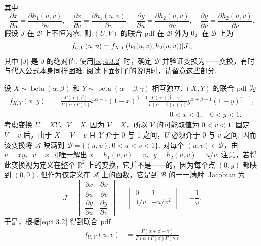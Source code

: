 其中
$$
\frac{\partial x}{\partial u}=\frac{\partial h_1(u,v)}{\partial u},\quad
\frac{\partial x}{\partial v}=\frac{\partial h_1(u,v)}{\partial v},\quad
\frac{\partial y}{\partial u}=\frac{\partial h_2(u,v)}{\partial u},\quad
\frac{\partial y}{\partial v}=\frac{\partial h_2(u,v)}{\partial v}.
$$
假设 $J$ 在 $\mathscr B$ 上不恒为零. 则 $(U,V)$ 的联合 pdf 在 $\mathscr B$ 外为 0，在 $\mathscr B$ 上为
\begin{equation}\label{eq:4.3.2}\index{SI0829@二元变换}
f_{U,V}(u,v)=f_{X,Y}(h_1(u,v),h_2(u,v))|J|,
\end{equation}
其中 $|J|$ 是 $J$ 的绝对值. 使用\eqref{eq:4.3.2} 时，确定 $\mathscr B$ 并验证变换为一一变换，有时与代入公式本身同样困难. 阅读下面例子的说明时，请留意这些部分.
\begin{example}\label{ex:4.3.3}
设 $X\sim\operatorname{beta}(\alpha,\beta)$ 和 $Y\sim\operatorname{beta}(\alpha+\beta,\gamma)$ 相互独立. $(X,Y)$ 的联合 pdf 为
$$
\begin{aligned}
f_{X,Y}(x,y)&=\frac{\Gamma(\alpha+\beta)}{\Gamma(\alpha)\Gamma(\beta)}x^{\alpha-1}(1-x)^{\beta-1}
\frac{\Gamma(\alpha+\beta+\gamma)}{\Gamma(\alpha+\beta)\Gamma(\gamma)}y^{\alpha+\beta-1}(1-y)^{\gamma-1},\\
&\hspace{7cm}0<x<1,\quad0<y<1.
\end{aligned}
$$
考虑变换 $U=XY$、$V=X$. 因为 $V=X$，所以 $V$ 的可能取值为 $0<v<1$. 固定 $V=v$ 后，由于 $X=V=v$ 且 $Y$ 介于 0 与 1 之间，$U$ 必须介于 0 与 $v$ 之间. 因而该变换将 $\mathscr A$ 映满到 $\mathscr B=\{(u,v):0<u<v<1\}$. 对每个 $(u,v)\in\mathscr B$，由 $u=xy$、$v=x$ 可唯一解出 $x=h_1(u,v)=v$、$y=h_2(u,v)=u/v$. 注意，若将此变换视为定义在整个 $\mathbb R^2$ 上的变换，它并不是一一的，因为每个点 $(0,y)$ 都映到 $(0,0)$. 但作为仅定义在 $\mathscr A$ 上的函数，它是到 $\mathscr B$ 的一一满射. Jacobian 为
$$J=\begin{vmatrix}\dfrac{\partial x}{\partial u}&\dfrac{\partial x}{\partial v}\\[4pt]\dfrac{\partial y}{\partial u}&\dfrac{\partial y}{\partial v}\end{vmatrix}
=\begin{vmatrix}0&1\\[2pt]1/v&-u/v^2\end{vmatrix}=-\frac1v.$$
于是，根据\eqref{eq:4.3.2} 得到联合 pdf
\begin{equation}\label{eq:4.3.3}
\begin{aligned}
f_{U,V}(u,v)&=\frac{\Gamma(\alpha+\beta+\gamma)}{\Gamma(\alpha)\Gamma(\beta)\Gamma(\gamma)}

\end{aligned}
\end{equation}
\end{example}
